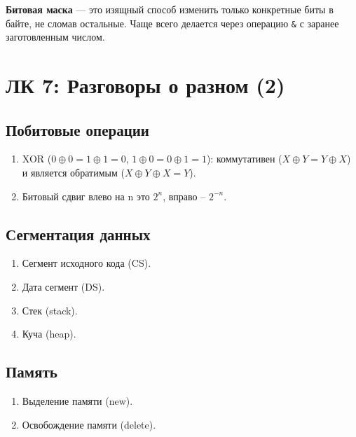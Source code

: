 \documentclass[a4paper, 12pt]{article}
\newcommand{\term}[1]{\textbf{#1}} %
\newcommand{\code}[1]{\texttt{#1}} %
\begin{document}
\term{Битовая маска} --- это изящный способ изменить только конкретные биты в байте, не сломав остальные. Чаще всего делается через операцию \code{\&} с заранее заготовленным числом.

\newpage

\section{ЛК 7: Разговоры о разном (2)}
\label{sec:l7}

\subsection*{Побитовые операции}
\begin{enumerate}
    \item XOR ($0 \oplus 0 = 1 \oplus 1 = 0$, $1 \oplus 0 = 0 \oplus 1 = 1$): коммутативен ($X \oplus Y = Y \oplus X$) и является обратимым ($X \oplus Y \oplus X = Y$).
    \item Битовый сдвиг влево на n это $2^n$, вправо -- $2^{-n}$.
\end{enumerate}

\subsection*{Сегментация данных}
\begin{enumerate}
    \item Сегмент исходного кода (CS).
    \item Дата сегмент (DS).
    \item Стек (stack).
    \item Куча (heap).
\end{enumerate}

\subsection*{Память}
\begin{enumerate}
    \item Выделение памяти (new).
    \item Освобождение памяти (delete).
\end{enumerate}
\end{document}
